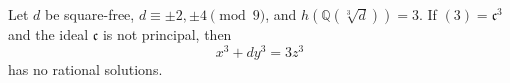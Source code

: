 \begin{proposition}
    Let $d$ be square-free, $d\equiv\pm2,\pm4\pmod9$, and $h(\mathbb{Q}(\sqrt[3]{d}))=3$. If $(3)=\mathfrak{c}^3$ and the ideal $\mathfrak{c}$ is not principal, then
\[
    x^3+dy^3=3z^3
\]
    has no rational solutions.
\end{proposition}
